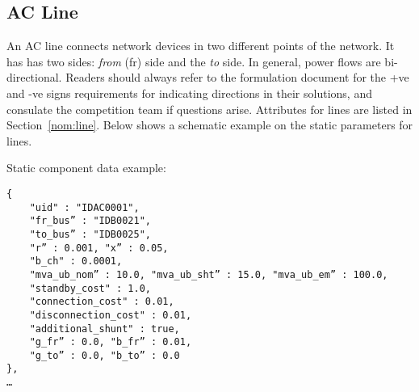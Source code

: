 \subsection{AC Line}
\label{sec:acline}
An AC line connects network devices in two different points of the network. 
It has has two sides: \emph{from} (fr) side and the \emph{to} side.
In general, power flows are bi-directional. 
Readers should always refer to the formulation document for the +ve and -ve signs
requirements for indicating directions in their solutions,
and consulate the competition team if questions arise.
Attributes for lines are listed in Section~\ref{nom:line}.
Below shows a schematic example on the static parameters for lines.

Static component data example:
\begin{verbatim}
{
    "uid" : "IDAC0001",
    "fr_bus” : "IDB0021",
    "to_bus” : "IDB0025",
    "r” : 0.001, "x” : 0.05, 
    "b_ch" : 0.0001,
    "mva_ub_nom” : 10.0, "mva_ub_sht” : 15.0, "mva_ub_em” : 100.0,
    "standby_cost" : 1.0,
    "connection_cost" : 0.01,
    "disconnection_cost" : 0.01,
    "additional_shunt" : true,
    "g_fr” : 0.0, "b_fr” : 0.01,
    "g_to” : 0.0, "b_to” : 0.0    
},
…     
\end{verbatim}


